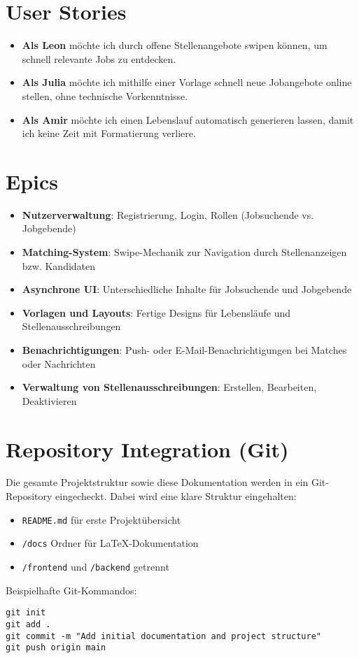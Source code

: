 \documentclass[a4paper,12pt]{article}
\begin{document}
\section{User Stories}

\begin{itemize}[leftmargin=1.5cm]
    \item \textbf{Als Leon} möchte ich durch offene Stellenangebote swipen können, um schnell relevante Jobs zu entdecken.
    \item \textbf{Als Julia} möchte ich mithilfe einer Vorlage schnell neue Jobangebote online stellen, ohne technische Vorkenntnisse.
    \item \textbf{Als Amir} möchte ich einen Lebenslauf automatisch generieren lassen, damit ich keine Zeit mit Formatierung verliere.
\end{itemize}

\section{Epics}

\begin{itemize}[leftmargin=1.5cm]
    \item \textbf{Nutzerverwaltung}: Registrierung, Login, Rollen (Jobsuchende vs. Jobgebende)
    \item \textbf{Matching-System}: Swipe-Mechanik zur Navigation durch Stellenanzeigen bzw. Kandidaten
    \item \textbf{Asynchrone UI}: Unterschiedliche Inhalte für Jobsuchende und Jobgebende
    \item \textbf{Vorlagen und Layouts}: Fertige Designs für Lebensläufe und Stellenausschreibungen
    \item \textbf{Benachrichtigungen}: Push- oder E-Mail-Benachrichtigungen bei Matches oder Nachrichten
    \item \textbf{Verwaltung von Stellenausschreibungen}: Erstellen, Bearbeiten, Deaktivieren
\end{itemize}

\section{Repository Integration (Git)}

Die gesamte Projektstruktur sowie diese Dokumentation werden in ein Git-Repository eingecheckt. Dabei wird eine klare Struktur eingehalten:

\begin{itemize}
    \item \texttt{README.md} für erste Projektübersicht
    \item \texttt{/docs} Ordner für LaTeX-Dokumentation
    \item \texttt{/frontend} und \texttt{/backend} getrennt
\end{itemize}

\noindent Beispielhafte Git-Kommandos:

\begin{verbatim}
git init
git add .
git commit -m "Add initial documentation and project structure"
git push origin main
\end{verbatim}
\end{document}
